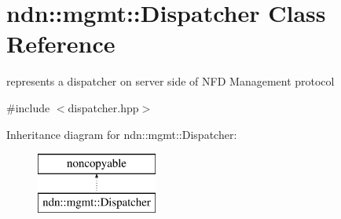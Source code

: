 \hypertarget{classndn_1_1mgmt_1_1Dispatcher}{}\section{ndn\+:\+:mgmt\+:\+:Dispatcher Class Reference}
\label{classndn_1_1mgmt_1_1Dispatcher}


represents a dispatcher on server side of N\+FD Management protocol  




{\ttfamily \#include $<$dispatcher.\+hpp$>$}

Inheritance diagram for ndn\+:\+:mgmt\+:\+:Dispatcher\+:\begin{figure}[H]
\begin{center}
\leavevmode
\includegraphics[height=2.000000cm]{classndn_1_1mgmt_1_1Dispatcher}
\end{center}
\end{figure}
